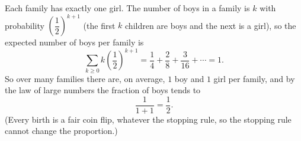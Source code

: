 Each family has exactly one girl. The number of boys in a family is $k$ with probability $\left(\dfrac{1}{2}\right)^{k+1}$ (the first $k$ children are boys and the next is a girl), so the expected number of boys per family is
\[
\sum_{k\ge0}k\left(\dfrac{1}{2}\right)^{k+1}=\dfrac{1}{4}+\dfrac{2}{8}+\dfrac{3}{16}+\cdots=1 .
\]
So over many families there are, on average, $1$ boy and $1$ girl per family, and by the law of large numbers the fraction of boys tends to
\[
\dfrac{1}{1+1}=\boxed{\dfrac{1}{2}} .
\]
(Every birth is a fair coin flip, whatever the stopping rule, so the stopping rule cannot change the proportion.)

